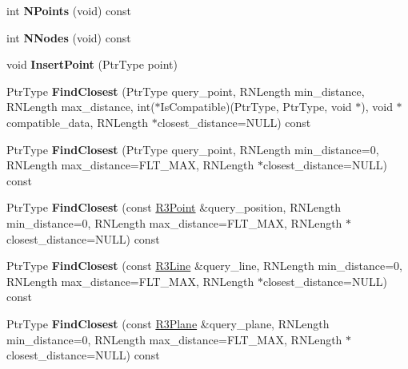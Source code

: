 \begin{DoxyCompactItemize}
\item 
int {\bfseries N\+Points} (void) const \hypertarget{class_r3_kdtree_afbe168c70253c18fd9e284dc09897451}{}\label{class_r3_kdtree_afbe168c70253c18fd9e284dc09897451}

\item 
int {\bfseries N\+Nodes} (void) const \hypertarget{class_r3_kdtree_a7169b0048894065d599abbe923ffe5e9}{}\label{class_r3_kdtree_a7169b0048894065d599abbe923ffe5e9}

\item 
void {\bfseries Insert\+Point} (Ptr\+Type point)\hypertarget{class_r3_kdtree_a08512b73a97e6904754cd607edb022b8}{}\label{class_r3_kdtree_a08512b73a97e6904754cd607edb022b8}

\item 
Ptr\+Type {\bfseries Find\+Closest} (Ptr\+Type query\+\_\+point, R\+N\+Length min\+\_\+distance, R\+N\+Length max\+\_\+distance, int($\ast$Is\+Compatible)(Ptr\+Type, Ptr\+Type, void $\ast$), void $\ast$compatible\+\_\+data, R\+N\+Length $\ast$closest\+\_\+distance=N\+U\+LL) const \hypertarget{class_r3_kdtree_adc9970c4c0f53c8cd09766f213142e5a}{}\label{class_r3_kdtree_adc9970c4c0f53c8cd09766f213142e5a}

\item 
Ptr\+Type {\bfseries Find\+Closest} (Ptr\+Type query\+\_\+point, R\+N\+Length min\+\_\+distance=0, R\+N\+Length max\+\_\+distance=F\+L\+T\+\_\+\+M\+AX, R\+N\+Length $\ast$closest\+\_\+distance=N\+U\+LL) const \hypertarget{class_r3_kdtree_a8dfd4edac8c4ebd8e3080be323f9e7df}{}\label{class_r3_kdtree_a8dfd4edac8c4ebd8e3080be323f9e7df}

\item 
Ptr\+Type {\bfseries Find\+Closest} (const \hyperlink{class_r3_point}{R3\+Point} \&query\+\_\+position, R\+N\+Length min\+\_\+distance=0, R\+N\+Length max\+\_\+distance=F\+L\+T\+\_\+\+M\+AX, R\+N\+Length $\ast$closest\+\_\+distance=N\+U\+LL) const \hypertarget{class_r3_kdtree_a5f964e682676ae805872187273a557c8}{}\label{class_r3_kdtree_a5f964e682676ae805872187273a557c8}

\item 
Ptr\+Type {\bfseries Find\+Closest} (const \hyperlink{class_r3_line}{R3\+Line} \&query\+\_\+line, R\+N\+Length min\+\_\+distance=0, R\+N\+Length max\+\_\+distance=F\+L\+T\+\_\+\+M\+AX, R\+N\+Length $\ast$closest\+\_\+distance=N\+U\+LL) const \hypertarget{class_r3_kdtree_a63a4dc8766ec8101e64d5b324e1012db}{}\label{class_r3_kdtree_a63a4dc8766ec8101e64d5b324e1012db}

\item 
Ptr\+Type {\bfseries Find\+Closest} (const \hyperlink{class_r3_plane}{R3\+Plane} \&query\+\_\+plane, R\+N\+Length min\+\_\+distance=0, R\+N\+Length max\+\_\+distance=F\+L\+T\+\_\+\+M\+AX, R\+N\+Length $\ast$closest\+\_\+distance=N\+U\+LL) const \hypertarget{class_r3_kdtree_a5c0894b4d1c0d8afe50b13f9047a92a8}{}\label{class_r3_kdtree_a5c0894b4d1c0d8afe50b13f9047a92a8}


\end{DoxyCompactItemize}
